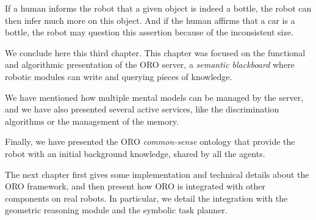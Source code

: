 If a human informs the robot that a given object is indeed a bottle, the robot
can then infer much more on this object. And if the human affirms that a car is
a bottle, the robot may question this assertion because of the inconsistent
size.

\recap

We conclude here this third chapter. This chapter was focused on the functional
and algorithmic presentation of the ORO server, a \emph{semantic blackboard}
where robotic modules can write and querying pieces of knowledge.

We have mentioned how multiple mental models can be managed by the server, and
we have also presented several active services, like the discrimination
algorithms or the management of the memory.

Finally, we have presented the ORO \emph{common-sense} ontology that provide
the robot with an initial background knowledge, shared by all the agents.

The next chapter first gives some implementation and technical details about
the ORO framework, and then present how ORO is integrated with other components
on real robots. In particular, we detail the integration with the geometric
reasoning module and the symbolic task planner.


